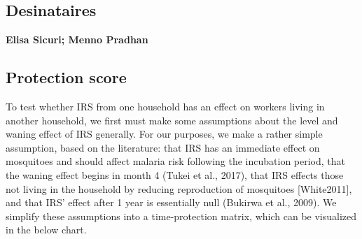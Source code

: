 \documentclass[]{article}
\begin{document}
\noindent{}

\vfill
\null

\subsection*{Desinataires}

\textbf{Elisa Sicuri; Menno Pradhan}

\vspace{3mm}

\newpage

\subsection{Protection score}\label{protection-score}

To test whether IRS from one household has an effect on workers living
in another household, we first must make some assumptions about the
level and waning effect of IRS generally. For our purposes, we make a
rather simple assumption, based on the literature: that IRS has an
immediate effect on mosquitoes and should affect malaria risk following
the incubation period, that the waning effect begins in month 4 (Tukei
et al., 2017), that IRS effects those not living in the household by
reducing reproduction of mosquitoes {[}White2011{]}, and that IRS'
effect after 1 year is essentially null (Bukirwa et al., 2009). We
simplify these assumptions into a time-protection matrix, which can be
visualized in the below chart.
\end{document}
